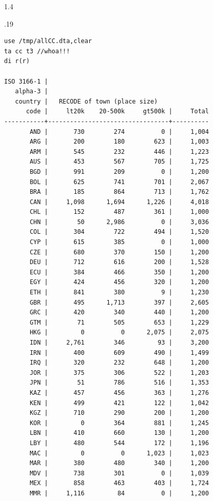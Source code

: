 \documentclass[10pt, letterpaper]{article}
\begin{document}
\begin{spacing}{1.4}
\begin{scriptsize}
\begin{spacing}{.19} 
\begin{verbatim}
use /tmp/allCC.dta,clear
ta cc t3 //whoa!!!
di r(r)

ISO 3166-1 |
   alpha-3 |
   country |   RECODE of town (place size)
      code |     lt20k    20-500k     gt500k |     Total
-----------+---------------------------------+----------
       AND |       730        274          0 |     1,004 
       ARG |       200        180        623 |     1,003 
       ARM |       545        232        446 |     1,223 
       AUS |       453        567        705 |     1,725 
       BGD |       991        209          0 |     1,200 
       BOL |       625        741        701 |     2,067 
       BRA |       185        864        713 |     1,762 
       CAN |     1,098      1,694      1,226 |     4,018 
       CHL |       152        487        361 |     1,000 
       CHN |        50      2,986          0 |     3,036 
       COL |       304        722        494 |     1,520 
       CYP |       615        385          0 |     1,000 
       CZE |       680        370        150 |     1,200 
       DEU |       712        616        200 |     1,528 
       ECU |       384        466        350 |     1,200 
       EGY |       424        456        320 |     1,200 
       ETH |       841        380          9 |     1,230 
       GBR |       495      1,713        397 |     2,605 
       GRC |       420        340        440 |     1,200 
       GTM |        71        505        653 |     1,229 
       HKG |         0          0      2,075 |     2,075 
       IDN |     2,761        346         93 |     3,200 
       IRN |       400        609        490 |     1,499 
       IRQ |       320        232        648 |     1,200 
       JOR |       375        306        522 |     1,203 
       JPN |        51        786        516 |     1,353 
       KAZ |       457        456        363 |     1,276 
       KEN |       499        421        122 |     1,042 
       KGZ |       710        290        200 |     1,200 
       KOR |         0        364        881 |     1,245 
       LBN |       410        660        130 |     1,200 
       LBY |       480        544        172 |     1,196 
       MAC |         0          0      1,023 |     1,023 
       MAR |       380        480        340 |     1,200 
       MDV |       738        301          0 |     1,039 
       MEX |       858        463        403 |     1,724 
       MMR |     1,116         84          0 |     1,200 

\end{verbatim}
\end{spacing}
\end{scriptsize}
\end{spacing}
\end{document}
